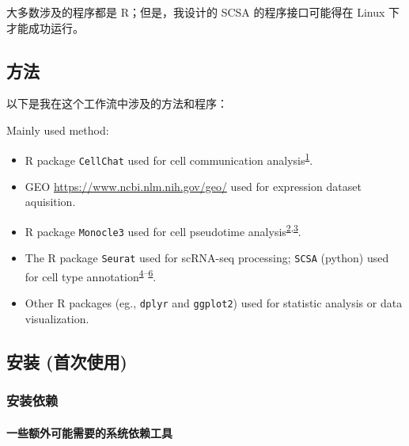 \documentclass[
]{article}
\providecommand{\tightlist}{%
  \setlength{\itemsep}{0pt}\setlength{\parskip}{0pt}}
\begin{document}
大多数涉及的程序都是 R；但是，我设计的 SCSA 的程序接口可能得在 Linux 下才能成功运行。

\hypertarget{ux65b9ux6cd5}{%
\subsection{方法}\label{ux65b9ux6cd5}}

以下是我在这个工作流中涉及的方法和程序：

Mainly used method:

\begin{itemize}
\tightlist
\item
  R package \texttt{CellChat} used for cell communication analysis\textsuperscript{\protect\hyperlink{ref-InferenceAndAJinS2021}{1}}.
\item
  GEO \url{https://www.ncbi.nlm.nih.gov/geo/} used for expression dataset aquisition.
\item
  R package \texttt{Monocle3} used for cell pseudotime analysis\textsuperscript{\protect\hyperlink{ref-ReversedGraphQiuX2017}{2},\protect\hyperlink{ref-TheDynamicsAnTrapne2014}{3}}.
\item
  The R package \texttt{Seurat} used for scRNA-seq processing; \texttt{SCSA} (python) used for cell type annotation\textsuperscript{\protect\hyperlink{ref-IntegratedAnalHaoY2021}{4}--\protect\hyperlink{ref-ScsaACellTyCaoY2020}{6}}.
\item
  Other R packages (eg., \texttt{dplyr} and \texttt{ggplot2}) used for statistic analysis or data visualization.
\end{itemize}

\hypertarget{ux5b89ux88c5-ux9996ux6b21ux4f7fux7528}{%
\subsection{安装 (首次使用)}\label{ux5b89ux88c5-ux9996ux6b21ux4f7fux7528}}

\hypertarget{ux5b89ux88c5ux4f9dux8d56}{%
\subsubsection{安装依赖}\label{ux5b89ux88c5ux4f9dux8d56}}

\hypertarget{ux4e00ux4e9bux989dux5916ux53efux80fdux9700ux8981ux7684ux7cfbux7edfux4f9dux8d56ux5de5ux5177}{%
\paragraph{一些额外可能需要的系统依赖工具}\label{ux4e00ux4e9bux989dux5916ux53efux80fdux9700ux8981ux7684ux7cfbux7edfux4f9dux8d56ux5de5ux5177}}
\end{document}
